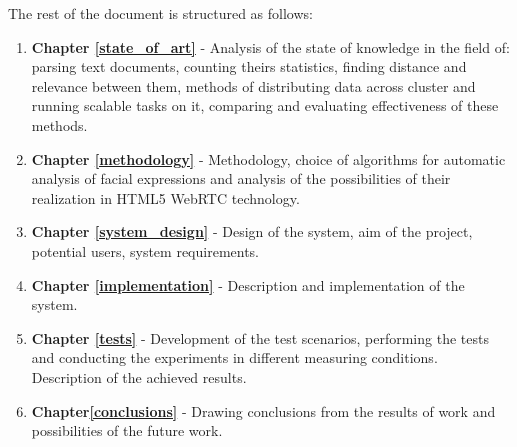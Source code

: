 The rest of the document is structured as follows:
\begin{enumerate}
	\item \textbf{Chapter \ref{state_of_art}} - Analysis of the state of knowledge in the field of: parsing text documents, counting theirs statistics, finding distance and relevance between them, methods of distributing data across cluster and running scalable tasks on it, comparing and evaluating effectiveness of these methods.
	\item \textbf{Chapter \ref{methodology}} - Methodology, choice of algorithms for automatic analysis of facial expressions and analysis of the possibilities of their realization in HTML5 WebRTC technology. 
	\item \textbf{Chapter \ref{system_design}} - Design of the system, aim of the project, potential users, system requirements.
	\item \textbf{Chapter \ref{implementation}} - Description and implementation of the system.
	\item \textbf{Chapter \ref{tests}} - Development of the test scenarios, performing the tests and conducting the experiments in different measuring conditions. Description of the achieved results.
	\item \textbf{Chapter\ref{conclusions}} - Drawing conclusions from the results of work and possibilities of the future work.
\end{enumerate}
